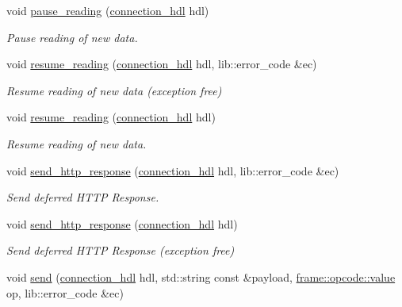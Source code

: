 \begin{DoxyCompactItemize}
void \hyperlink{classwebsocketpp_1_1endpoint_af7ec27363d0fb1d657a264c4ad853b8e}{pause\+\_\+reading} (\hyperlink{namespacewebsocketpp_a6b3d26a10ee7229b84b776786332631d}{connection\+\_\+hdl} hdl)
\begin{DoxyCompactList}\small\item\em Pause reading of new data. \end{DoxyCompactList}\item 
void \hyperlink{classwebsocketpp_1_1endpoint_a9753aaade09c9a7a0efd459861ba3b97}{resume\+\_\+reading} (\hyperlink{namespacewebsocketpp_a6b3d26a10ee7229b84b776786332631d}{connection\+\_\+hdl} hdl, lib\+::error\+\_\+code \&ec)
\begin{DoxyCompactList}\small\item\em Resume reading of new data (exception free) \end{DoxyCompactList}\item 
void \hyperlink{classwebsocketpp_1_1endpoint_a4592d2270f56fce0f30a41cd17f77650}{resume\+\_\+reading} (\hyperlink{namespacewebsocketpp_a6b3d26a10ee7229b84b776786332631d}{connection\+\_\+hdl} hdl)
\begin{DoxyCompactList}\small\item\em Resume reading of new data. \end{DoxyCompactList}\item 
void \hyperlink{classwebsocketpp_1_1endpoint_ae78b1414f7e0cf71c9eab0a29efab8a1}{send\+\_\+http\+\_\+response} (\hyperlink{namespacewebsocketpp_a6b3d26a10ee7229b84b776786332631d}{connection\+\_\+hdl} hdl, lib\+::error\+\_\+code \&ec)
\begin{DoxyCompactList}\small\item\em Send deferred H\+T\+T\+P Response. \end{DoxyCompactList}\item 
void \hyperlink{classwebsocketpp_1_1endpoint_af29ca34a6659beea0422a2f27718b9c2}{send\+\_\+http\+\_\+response} (\hyperlink{namespacewebsocketpp_a6b3d26a10ee7229b84b776786332631d}{connection\+\_\+hdl} hdl)
\begin{DoxyCompactList}\small\item\em Send deferred H\+T\+T\+P Response (exception free) \end{DoxyCompactList}\item 
void \hyperlink{classwebsocketpp_1_1endpoint_a5341f59de7ef1a565a2fd93daba212d5}{send} (\hyperlink{namespacewebsocketpp_a6b3d26a10ee7229b84b776786332631d}{connection\+\_\+hdl} hdl, std\+::string const \&payload, \hyperlink{namespacewebsocketpp_1_1frame_1_1opcode_ae68711643096dfc4af6d66ade3f9fd5e}{frame\+::opcode\+::value} op, lib\+::error\+\_\+code \&ec)

\end{DoxyCompactItemize}
